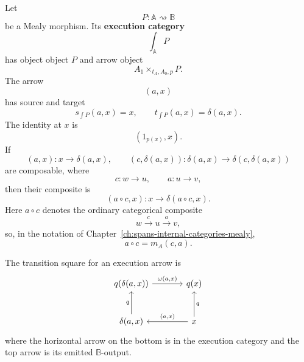 \begin{definition}
\label{def:execution-category}
    Let
    \[
        P:\mathbb A\rightsquigarrow\mathbb B
    \]
    be a Mealy morphism. Its \textbf{execution category}
    \[
        \int_{\mathbb A}P
    \]
    has object object \(P\) and arrow object
    \[
        A_1\times_{t_A,A_0,p}P.
    \]
    The arrow
    \[
        (a,x)
    \]
    has source and target
    \[
        s_{\int P}(a,x)=x,
        \qquad
        t_{\int P}(a,x)=\delta(a,x).
    \]
    The identity at \(x\) is
    \[
        (1_{p(x)},x).
    \]
    If
    \[
        (a,x):x\to\delta(a,x),
        \qquad
        (c,\delta(a,x)):
        \delta(a,x)\to\delta(c,\delta(a,x))
    \]
    are composable, where
    \[
        c:w\to u,
        \qquad
        a:u\to v,
    \]
    then their composite is
    \[
        (a\circ c,x):x\to\delta(a\circ c,x).
    \]
    Here \(a\circ c\) denotes the ordinary categorical composite
    \[
        w\xrightarrow{c}u\xrightarrow{a}v,
    \]
    so, in the notation of Chapter~\ref{ch:spans-internal-categories-mealy},
    \[
        a\circ c=m_A(c,a).
    \]
\end{definition}

The transition square for an execution arrow is
\[
    \begin{tikzcd}[column sep=large, row sep=large]
            {q(\delta(a,x))}
                \arrow[r, "{\omega(a,x)}"]
        &
            {q(x)}
            \\
            {\delta(a,x)}
                \arrow[u, "q"]
        &
            {x}
                \arrow[l, "{(a,x)}"']
                \arrow[u, "q"']
    \end{tikzcd}
\]
where the horizontal arrow on the bottom is in the execution category and the top arrow is its emitted \(\mathbb B\)-output.

